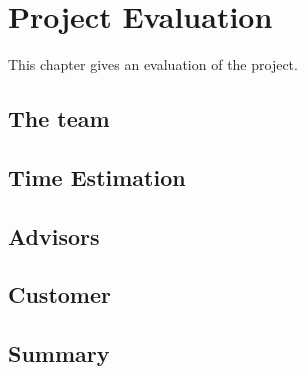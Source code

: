 \chapter{Project Evaluation}
This chapter gives an evaluation of the project.

\section{The team}

\section{Time Estimation}

\section{Advisors}

\section{Customer}

\section{Summary}


